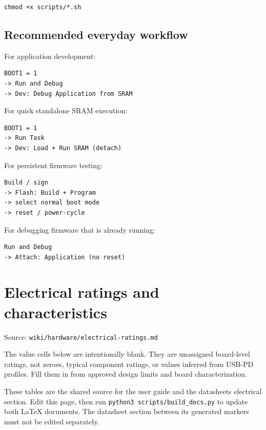 \documentclass[10pt,a4paper,oneside]{report}
\begin{document}
\begin{verbatim}
chmod +x scripts/*.sh
\end{verbatim}

\section{Recommended everyday workflow}\label{wiki-getting-started-build-flash-debug--15-recommended-everyday-workflow}

For application development:

\begin{verbatim}
BOOT1 = 1
-> Run and Debug
-> Dev: Debug Application from SRAM
\end{verbatim}

For quick standalone SRAM execution:

\begin{verbatim}
BOOT1 = 1
-> Run Task
-> Dev: Load + Run SRAM (detach)
\end{verbatim}

For persistent firmware testing:

\begin{verbatim}
Build / sign
-> Flash: Build + Program
-> select normal boot mode
-> reset / power-cycle
\end{verbatim}

For debugging firmware that is already running:

\begin{verbatim}
Run and Debug
-> Attach: Application (no reset)
\end{verbatim}

\chapter{Electrical ratings and characteristics}\label{wiki-hardware-electrical-ratings--electrical-ratings-and-characteristics}

{\small\color{MGSMuted}Source: \nolinkurl{wiki/hardware/electrical-ratings.md}\par}\medskip

The value cells below are intentionally blank. They are unassigned board-level ratings, not zeroes, typical component ratings, or values inferred from USB-PD profiles. Fill them in from approved design limits and board characterization.

These tables are the shared source for the user guide and the datasheet\textquotesingle s electrical section. Edit this page, then run \texttt{python3 scripts/\allowbreak{}build\_\allowbreak{}docs.\allowbreak{}py} to update both LaTeX documents. The datasheet section between its generated markers must not be edited separately.
\end{document}
